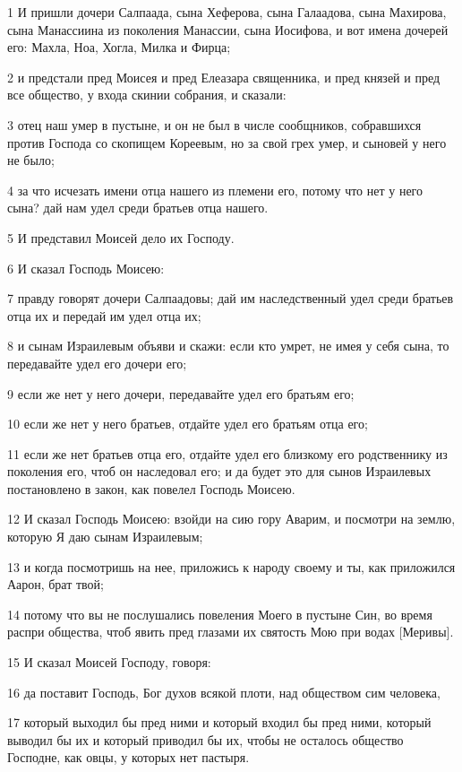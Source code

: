 \par 1 И пришли дочери Салпаада, сына Хеферова, сына Галаадова, сына Махирова, сына Манассиина из поколения Манассии, сына Иосифова, и вот имена дочерей его: Махла, Ноа, Хогла, Милка и Фирца;
\par 2 и предстали пред Моисея и пред Елеазара священника, и пред князей и пред все общество, у входа скинии собрания, и сказали:
\par 3 отец наш умер в пустыне, и он не был в числе сообщников, собравшихся против Господа со скопищем Кореевым, но за свой грех умер, и сыновей у него не было;
\par 4 за что исчезать имени отца нашего из племени его, потому что нет у него сына? дай нам удел среди братьев отца нашего.
\par 5 И представил Моисей дело их Господу.
\par 6 И сказал Господь Моисею:
\par 7 правду говорят дочери Салпаадовы; дай им наследственный удел среди братьев отца их и передай им удел отца их;
\par 8 и сынам Израилевым объяви и скажи: если кто умрет, не имея у себя сына, то передавайте удел его дочери его;
\par 9 если же нет у него дочери, передавайте удел его братьям его;
\par 10 если же нет у него братьев, отдайте удел его братьям отца его;
\par 11 если же нет братьев отца его, отдайте удел его близкому его родственнику из поколения его, чтоб он наследовал его; и да будет это для сынов Израилевых постановлено в закон, как повелел Господь Моисею.
\par 12 И сказал Господь Моисею: взойди на сию гору Аварим, и посмотри на землю, которую Я даю сынам Израилевым;
\par 13 и когда посмотришь на нее, приложись к народу своему и ты, как приложился Аарон, брат твой;
\par 14 потому что вы не послушались повеления Моего в пустыне Син, во время распри общества, чтоб явить пред глазами их святость Мою при водах [Меривы].
\par 15 И сказал Моисей Господу, говоря:
\par 16 да поставит Господь, Бог духов всякой плоти, над обществом сим человека,
\par 17 который выходил бы пред ними и который входил бы пред ними, который выводил бы их и который приводил бы их, чтобы не осталось общество Господне, как овцы, у которых нет пастыря.
